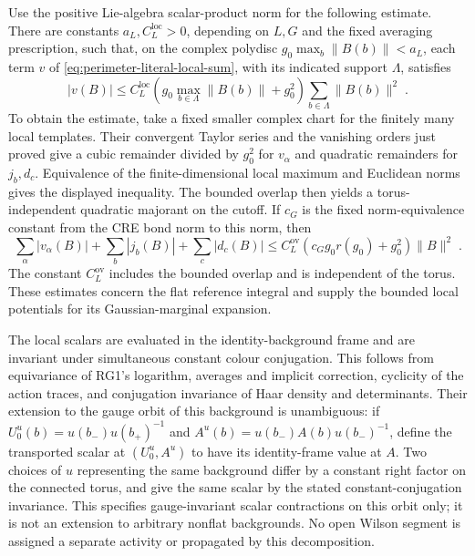 \documentclass[11pt]{article}
\begin{document}
Use the positive Lie-algebra scalar-product norm for the following estimate. There are constants $a_L,C_L^{\mathrm{loc}}>0$, depending on $L,G$ and the fixed averaging prescription, such that, on the complex polydisc $g_0\max_b\|B(b)\|<a_L$, each term $v$ of \eqref{eq:perimeter-literal-local-sum}, with its indicated support $\Lambda$, satisfies
\begin{equation}\label{eq:perimeter-literal-local-bound}
    |v(B)|\leq C_L^{\mathrm{loc}}
        \left(g_0\max_{b\in\Lambda}\|B(b)\|+g_0^2\right)
        \sum_{b\in\Lambda}\|B(b)\|^2\;.
\end{equation}
To obtain the estimate, take a fixed smaller complex chart for the finitely many local templates. Their convergent Taylor series and the vanishing orders just proved give a cubic remainder divided by $g_0^2$ for $v_\alpha$ and quadratic remainders for $j_b,d_c$. Equivalence of the finite-dimensional local maximum and Euclidean norms gives the displayed inequality. The bounded overlap then yields a torus-independent quadratic majorant on the cutoff. If $c_G$ is the fixed norm-equivalence constant from the CRE bond norm to this norm, then
\begin{equation}\label{eq:perimeter-literal-total-reserve}
    \sum_\alpha|v_\alpha(B)|+\sum_b|j_b(B)|+\sum_c|d_c(B)|
        \leq C_L^{\mathrm{ov}}
            (c_Gg_0r(g_0)+g_0^2)\|B\|^2\;.
\end{equation}
The constant $C_L^{\mathrm{ov}}$ includes the bounded overlap and is independent of the torus. These estimates concern the flat reference integral and supply the bounded local potentials for its Gaussian-marginal expansion.

The local scalars are evaluated in the identity-background frame and are invariant under simultaneous constant colour conjugation. This follows from equivariance of RG1's logarithm, averages and implicit correction, cyclicity of the action traces, and conjugation invariance of Haar density and determinants. Their extension to the gauge orbit of this background is unambiguous: if $U^u_0(b)=u(b_-)u(b_+)^{-1}$ and $A^u(b)=u(b_-)A(b)u(b_-)^{-1}$, define the transported scalar at $(U^u_0,A^u)$ to have its identity-frame value at $A$. Two choices of $u$ representing the same background differ by a constant right factor on the connected torus, and give the same scalar by the stated constant-conjugation invariance. This specifies gauge-invariant scalar contractions on this orbit only; it is not an extension to arbitrary nonflat backgrounds. No open Wilson segment is assigned a separate activity or propagated by this decomposition.
\end{document}
